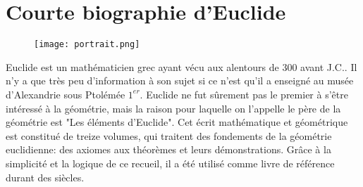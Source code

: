 \documentclass[a4paper,12pt]{article}
\begin{document}
\section{Courte biographie d'Euclide}

\begin{figure}[H]
    \centering
    \texttt{[image: portrait.png]}
\end{figure}
Euclide est un mathématicien grec ayant vécu aux alentours de 300 avant J.C.. Il n'y a que très peu d'information à son sujet si ce n'est qu'il a enseigné au musée d'Alexandrie sous Ptolémée $1^{er}$. Euclide ne fut sûrement pas le premier à s'être intéressé à la géométrie, mais la raison pour laquelle on l'appelle le père de la géométrie est "Les éléments d'Euclide". Cet écrit mathématique et géométrique est constitué de treize volumes, qui traitent des fondements de la géométrie euclidienne: des axiomes aux théorèmes et leurs démonstrations. Grâce à la simplicité et la logique de ce recueil, il a été utilisé comme livre de référence durant des siècles.
\end{document}
